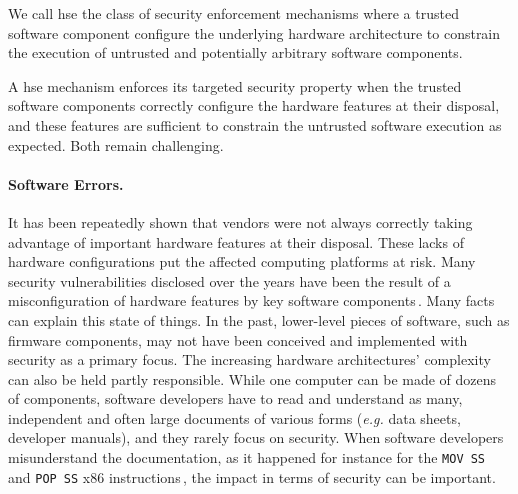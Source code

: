 \begin{definition}
  We call \ac{hse} the class of security enforcement mechanisms where a trusted
  software component configure the underlying hardware architecture to constrain
  the execution of untrusted and potentially arbitrary software components.
\end{definition}

A \ac{hse} mechanism enforces its targeted security property when the trusted
software components correctly configure the hardware features at their disposal,
and these features are sufficient to constrain the untrusted software execution
as expected.
%
Both remain challenging.

\paragraph{Software Errors.}
%
It has been repeatedly shown that vendors were not always correctly taking
advantage of important hardware features at their disposal.
%
These lacks of hardware configurations put the affected computing platforms at
risk.
%
Many security vulnerabilities disclosed over the years have been the result of a
misconfiguration of hardware features by key software
components\,\cite{bulygin2014bios}.
%
Many facts can explain this state of things.
%
In the past, lower-level pieces of software, such as firmware components, may
not have been conceived and implemented with security as a primary focus.
%
The increasing hardware architectures' complexity can also be held partly
responsible.
%
While one computer can be made of dozens of components, software developers have
to read and understand as many, independent and often large documents of various
forms (\emph{e.g.} data sheets, developer manuals), and they rarely focus on
security.
%
When software developers misunderstand the documentation, as it happened for
instance for the \texttt{MOV SS} and \texttt{POP SS} x86
instructions\,\cite{movsspopss}, the impact in terms of security can be
important.

